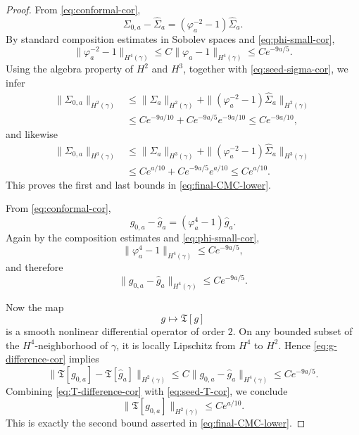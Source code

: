 \documentclass{amsart}
\begin{document}
\begin{proof}
\noindent
From \eqref{eq:conformal-cor},
\[
\Sigma_{0,a}-\widehat\Sigma_{a}=(\varphi_{a}^{-2}-1)\widehat\Sigma_{a}.
\]
By standard composition estimates in Sobolev spaces and \eqref{eq:phi-small-cor},
\begin{equation}
\label{eq:phi-inv-small-cor}
\|\varphi_{a}^{-2}-1\|_{H^{4}(\gamma)}
\le C\|\varphi_{a}-1\|_{H^{4}(\gamma)}
\le C e^{-9a/5}.
\end{equation}
Using the algebra property of \(H^{2}\) and \(H^{3}\), together with \eqref{eq:seed-sigma-cor}, we infer
\begin{align}
\|\Sigma_{0,a}\|_{H^{2}(\gamma)}
&\le \|\widehat\Sigma_{a}\|_{H^{2}(\gamma)}
   +\|(\varphi_{a}^{-2}-1)\widehat\Sigma_{a}\|_{H^{2}(\gamma)} \nonumber\\
&\le C e^{-9a/10}+C e^{-9a/5}e^{-9a/10}
\le C e^{-9a/10},
\label{eq:sigma-H2-cor}
\end{align}
and likewise
\begin{align}
\|\Sigma_{0,a}\|_{H^{3}(\gamma)}
&\le \|\widehat\Sigma_{a}\|_{H^{3}(\gamma)}
   +\|(\varphi_{a}^{-2}-1)\widehat\Sigma_{a}\|_{H^{3}(\gamma)} \nonumber\\
&\le C e^{a/10}+C e^{-9a/5}e^{a/10}
\le C e^{a/10}.
\label{eq:sigma-H3-cor}
\end{align}
This proves the first and last bounds in \eqref{eq:final-CMC-lower}.

\medskip

\noindent
From \eqref{eq:conformal-cor},
\[
g_{0,a}-\widehat g_{a}=(\varphi_{a}^{4}-1)\widehat g_{a}.
\]
Again by the composition estimates and \eqref{eq:phi-small-cor},
\[
\|\varphi_{a}^{4}-1\|_{H^{4}(\gamma)}\le C e^{-9a/5},
\]
and therefore
\begin{equation}
\label{eq:g-difference-cor}
\|g_{0,a}-\widehat g_{a}\|_{H^{4}(\gamma)}\le C e^{-9a/5}.
\end{equation}

\noindent Now the map
\[
g\mapsto \mathfrak T[g]
\]
is a smooth nonlinear differential operator of order \(2\). On any bounded subset of the \(H^{4}\)-neighborhood of \(\gamma\), it is locally Lipschitz from \(H^{4}\) to \(H^{2}\). Hence \eqref{eq:g-difference-cor} implies
\begin{equation}
\label{eq:T-difference-cor}
\|\mathfrak T[g_{0,a}]-\mathfrak T[\widehat g_{a}]\|_{H^{2}(\gamma)}
\le C \|g_{0,a}-\widehat g_{a}\|_{H^{4}(\gamma)}
\le C e^{-9a/5}.
\end{equation}
Combining \eqref{eq:T-difference-cor} with \eqref{eq:seed-T-cor}, we conclude
\begin{equation}
\label{eq:T-final-cor}
\|\mathfrak T[g_{0,a}]\|_{H^{2}(\gamma)}
\le C e^{a/10}.
\end{equation}
This is exactly the second bound asserted in \eqref{eq:final-CMC-lower}.


\end{proof}
\end{document}

